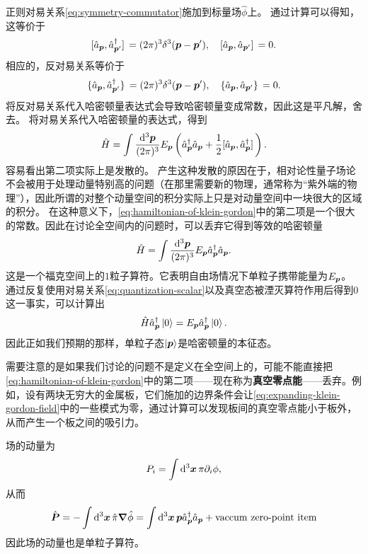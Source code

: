 \documentclass[hyperref, UTF8, a4paper]{ctexart}
\begin{document}
正则对易关系\eqref{eq:symmetry-commutator}施加到标量场$\hat{\phi}$上。
通过计算可以得知，这等价于
\begin{equation}
    \comm*{\hat{a}_{\vb*{p}}}{\hat{a}^\dagger_{\vb*{p}'}} = (2\pi)^3 \delta^3 (\vb*{p} - \vb*{p}'), \quad \comm*{\hat{a}_{\vb*{p}}}{\hat{a}_{\vb*{p}'}} = 0.
    \label{eq:quantization-scalar}
\end{equation}
相应的，反对易关系等价于
\[
    \acomm*{\hat{a}_{\vb*{p}}}{\hat{a}^\dagger_{\vb*{p}'}} = (2\pi)^3 \delta^3 (\vb*{p} - \vb*{p}'), \quad \acomm*{\hat{a}_{\vb*{p}}}{\hat{a}_{\vb*{p}'}} = 0.
\]
将反对易关系代入哈密顿量表达式会导致哈密顿量变成常数，因此这是平凡解，舍去。
将对易关系代入哈密顿量的表达式，得到
\begin{equation}
    \hat{H} = \int \frac{\dd[3]{\vb*{p}}}{(2\pi)^3} E_{\vb*{p}} \left(\hat{a}_{\vb*{p}}^\dagger \hat{a}_{\vb*{p}}  + \frac{1}{2} \comm*{\hat{a}_{\vb*{p}}}{\hat{a}^\dagger_{\vb*{p}}} \right).
    \label{eq:hamiltonian-of-klein-gordon}
\end{equation}
容易看出第二项实际上是发散的。
产生这种发散的原因在于，相对论性量子场论不会被用于处理动量特别高的问题（在那里需要新的物理，通常称为“紫外端的物理”），因此所谓的对整个动量空间的积分实际上只是对动量空间中一块很大的区域的积分。
在这种意义下，\eqref{eq:hamiltonian-of-klein-gordon}中的第二项是一个很大的常数。因此在讨论全空间内的问题时，可以丢弃它得到等效的哈密顿量
\begin{equation}
    \hat{H} = \int \frac{\dd[3]{\vb*{p}}}{(2\pi)^3} E_{\vb*{p}} \hat{a}_{\vb*{p}}^\dagger \hat{a}_{\vb*{p}}.
\end{equation}
这是一个福克空间上的$1$粒子算符。它表明自由场情况下单粒子携带能量为$E_{\vb*{p}}$。
通过反复使用对易关系\eqref{eq:quantization-scalar}以及真空态被湮灭算符作用后得到$0$这一事实，可以计算出
\begin{equation}
    \hat{H} \hat{a}_{\vb*{p}}^\dagger \ket{0} = E_{\vb*{p}} \hat{a}_{\vb*{p}}^\dagger \ket{0}.
\end{equation}
因此正如我们预期的那样，单粒子态$\ket{\vb*{p}}$是哈密顿量的本征态。

需要注意的是如果我们讨论的问题不是定义在全空间上的，可能不能直接把\eqref{eq:hamiltonian-of-klein-gordon}中的第二项——现在称为\textbf{真空零点能}——丢弃。例如，设有两块无穷大的金属板，它们施加的边界条件会让\eqref{eq:expanding-klein-gordon-field}中的一些模式为零，通过计算可以发现板间的真空零点能小于板外，从而产生一个板之间的吸引力。

场的动量为
\[
    P_i = \int \dd[3]{\vb*{x}} \pi \partial_i \phi,
\]
从而
\begin{equation}
    \hat{\vb*{P}} = - \int \dd[3]{\vb*{x}} \hat{\pi} \grad{\hat{\phi}} = \int \dd[3]{\vb*{x}} \vb*{p} \hat{a}^\dagger_{\vb*{p}} \hat{a}_{\vb*{p}} + \text{vaccum zero-point item}
\end{equation}
因此场的动量也是单粒子算符。
\end{document}
